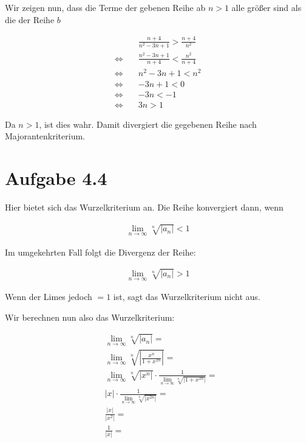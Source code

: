 \documentclass[a4paper,german,12pt,smallheadings]{scrartcl}
\begin{document}
Wir zeigen nun, dass die Terme der gebenen Reihe ab $n > 1$ alle größer sind
als die der Reihe $b$

\begin{align*}
 &\frac{n+4}{n^2-3n+1} > \frac{n+4}{n^2} \\
 \Leftrightarrow\quad& \frac{n^2-3n+1}{n+4} < \frac{n^2}{n+4} \\
 \Leftrightarrow\quad& n^2-3n+1 < n^2 \\
 \Leftrightarrow\quad& -3n+1 < 0 \\
 \Leftrightarrow\quad& -3n < -1 \\
 \Leftrightarrow\quad& 3n > 1
\end{align*}

Da $n > 1$, ist dies wahr. Damit divergiert die gegebenen Reihe nach Majorantenkriterium.

\section*{Aufgabe 4.4}
Hier bietet sich das Wurzelkriterium an. Die Reihe konvergiert dann, wenn

\begin{align*}
  \lim_{n \to \infty} \sqrt[n]{\left| a_n \right|} < 1
\end{align*}

Im umgekehrten Fall folgt die Divergenz der Reihe:

\begin{align*}
  \lim_{n \to \infty} \sqrt[n]{\left| a_n \right|} > 1
\end{align*}

Wenn der Limes jedoch $=1$ ist, sagt das Wurzelkriterium nicht aus.

Wir berechnen nun also das Wurzelkriterium:

\begin{align*}
  &\lim_{n \to \infty} \sqrt[n]{\left| a_n \right|} = \\
  &\lim_{n \to \infty} \sqrt[n]{\left| \frac{x^n}{1+x^{2n}} \right|} = \\
  &\lim_{n \to \infty} \sqrt[n]{\left| x^n \right|} \cdot \frac{1}{\lim_{n \to \infty} \sqrt[n]{\left| 1+x^{2n} \right|}} = \\
  &|x| \cdot \frac{1}{\lim_{n \to \infty} \sqrt[n]{\left| x^{2n} \right|}} = \\
  &\frac{|x|}{\left| x^2 \right|} =\\
  &\frac{1}{\left| x \right|} =\\
\end{align*}
\end{document}
